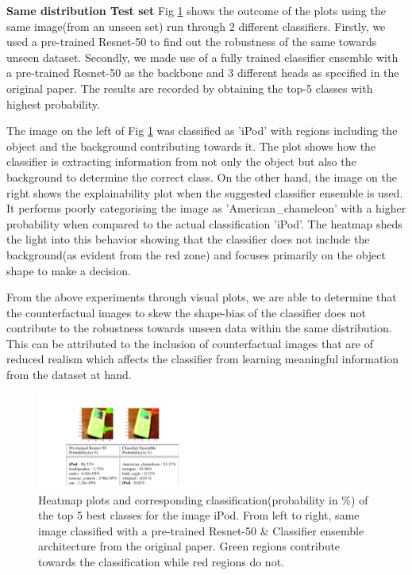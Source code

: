 \textbf{Same distribution Test set}
Fig \ref{fig:lime_plot} shows the outcome of the plots using the same image(from an unseen set) run through 2 different classifiers. Firstly, we used a pre-trained Resnet-50 to find out the robustness of the same towards unseen dataset. Secondly, we made use of a fully trained classifier ensemble with a pre-trained Resnet-50 as the backbone and 3 different heads as specified in the original paper\cite{sauer2021counterfactual}. The results are recorded by obtaining the top-5 classes with highest probability. 

The image on the left of Fig \ref{fig:lime_plot} was classified as 'iPod' with regions including the object and the background contributing towards it. The plot shows how the classifier is extracting information from not only the object but also the background to determine the correct class. On the other hand, the image on the right shows the explainability plot when the suggested classifier ensemble is used. It performs poorly categorising the image as 'American\_chameleon' with a higher probability when compared to the actual classification 'iPod'. The heatmap sheds the light into this behavior showing that the classifier does not include the background(as evident from the red zone) and focuses primarily on the object shape to make a decision.

From the above experiments through visual plots, we are able to determine that the counterfactual images to skew the shape-bias of the classifier does not contribute to the robustness towards unseen data within the same distribution. This can be attributed to the inclusion of counterfactual images that are of reduced realism which affects the classifier from learning meaningful information from the dataset at hand.

\begin{figure}[ht!]
\vspace{-4mm}
\centering
    \includegraphics[width=0.5\textwidth]{../openreview/limeplots/ipod_lime_plot.png}
    \caption{Heatmap plots and corresponding classification(probability in \%) of the top 5 best classes for the image iPod. From left to right, same image classified with a pre-trained Resnet-50 \& Classifier ensemble architecture from the original paper\cite{sauer2021counterfactual}. Green regions contribute towards the classification while red regions do not.
    }
    \label{fig:lime_plot}
\end{figure}


